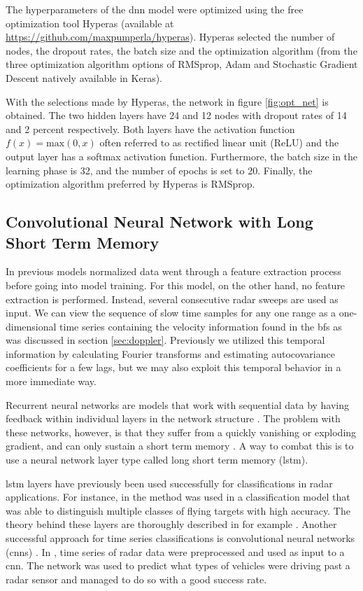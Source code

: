 The hyperparameters of the \gls{dnn} model were optimized using the free optimization tool Hyperas (available at \url{https://github.com/maxpumperla/hyperas}). Hyperas selected the number of nodes, the dropout rates, the batch size and the optimization algorithm (from the three optimization algorithm options of RMSprop, Adam and Stochastic Gradient Descent natively available in Keras). 

With the selections made by Hyperas, the network in figure \ref{fig:opt_net} is obtained. The two hidden layers have 24 and 12 nodes with dropout rates of 14 and 2 percent respectively. Both layers have the activation function $f(x)=\textrm{max}(0,x)$ often referred to as rectified linear unit (ReLU) and the output layer has a softmax activation function. Furthermore, the batch size in the learning phase is 32, and the number of epochs is set to 20. Finally, the optimization algorithm preferred by Hyperas is RMSprop.

\subsection{Convolutional Neural Network with Long Short Term Memory}

In previous models normalized data went through a feature extraction process before going into model training. For this model, on the other hand, no feature extraction is performed. Instead, several consecutive radar sweeps are used as input. We can view the sequence of slow time samples for any one range as a one-dimensional time series containing the velocity information found in the \gls{bf}s as was discussed in section \ref{sec:doppler}. Previously we utilized this temporal information by calculating Fourier transforms and estimating autocovariance coefficients for a few lags, but we may also exploit this temporal behavior in a more immediate way.

Recurrent neural networks are models that work with sequential data by having feedback within individual layers in the network structure \citep{karim_majumdar_darabi_chen_2018}. The problem with these networks, however, is that they suffer from a quickly vanishing or exploding gradient, and can only sustain a short term memory \citep{pascanu_mikolov_bengio_2013}. A way to combat this is to use a neural network layer type called long short term memory (\gls{lstm}).

\gls{lstm} layers have previously been used successfully for classifications in radar applications. For instance, in \citep{jithesh_sagayaraj_srinivasa_2017} the method was used in a classification model that was able to distinguish multiple classes of flying targets with high accuracy. The theory behind these layers are thoroughly described in for example \citep{hochreiter_schmidhuber_1997}. Another successful approach for time series classifications is convolutional neural networks (\gls{cnn}s) \citep{karim_majumdar_darabi_chen_2018}. In \citep{capobianco_facheris_cuccoli_marinai_2018}, time series of radar data were preprocessed and used as input to a \gls{cnn}. The network was used to predict what types of vehicles were driving past a radar sensor and managed to do so with a good success rate.

